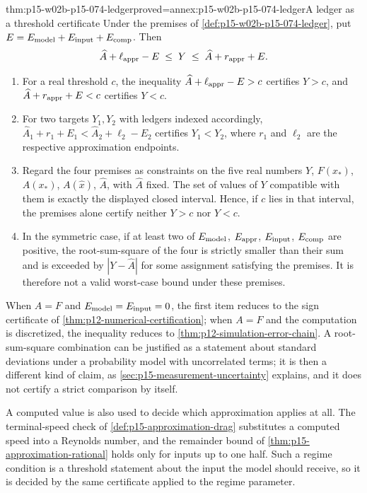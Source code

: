 \begin{hbtheorem}{thm:p15-w02b-p15-074-ledger}{proved=annex:p15-w02b-p15-074-ledger}{A ledger as a threshold certificate}
Under the premises of \cref{def:p15-w02b-p15-074-ledger}, put
\(E=E_{\rm model}+E_{\rm input}+E_{\rm comp}\). Then
\[
 \widehat A+\ell_{\rm appr}-E\;\leq\;Y\;\leq\;\widehat A+r_{\rm appr}+E.
\]
\begin{enumerate}
\item For a real threshold \(c\), the inequality
\(\widehat A+\ell_{\rm appr}-E>c\) certifies \(Y>c\), and
\(\widehat A+r_{\rm appr}+E<c\) certifies \(Y<c\).
\item For two targets \(Y_1,Y_2\) with ledgers indexed accordingly,
\(\widehat A_1+r_{1}+E_1<\widehat A_2+\ell_{2}-E_2\) certifies
\(Y_1<Y_2\), where \(r_1\) and \(\ell_2\) are the respective
approximation endpoints.
\item Regard the four premises as constraints on the five real numbers
\(Y\), \(F(x_*)\), \(A(x_*)\), \(A(\widehat x)\), \(\widehat A\), with
\(\widehat A\) fixed. The set of values of \(Y\) compatible with them is
exactly the displayed closed interval. Hence, if \(c\) lies in that
interval, the premises alone certify neither \(Y>c\) nor \(Y<c\).
\item In the symmetric case, if at least two of \(E_{\rm model}\),
\(E_{\rm appr}\), \(E_{\rm input}\), \(E_{\rm comp}\) are positive, the
root-sum-square of the four is strictly smaller than their sum and is
exceeded by \(|Y-\widehat A|\) for some assignment satisfying the premises.
It is therefore not a valid worst-case bound under these premises.
\end{enumerate}
\end{hbtheorem}

When \(A=F\) and \(E_{\rm model}=E_{\rm input}=0\), the first item reduces
to the sign certificate of \cref{thm:p12-numerical-certification}; when
\(A=F\) and the computation is discretized, the inequality reduces to
\cref{thm:p12-simulation-error-chain}. A root-sum-square combination can be
justified as a statement about standard deviations under a probability
model with uncorrelated terms; it is then a different kind of claim, as
\cref{sec:p15-measurement-uncertainty} explains, and it does not certify a
strict comparison by itself.

A computed value is also used to decide which approximation applies at all.
The terminal-speed check of \cref{def:p15-approximation-drag} substitutes a
computed speed into a Reynolds number, and the remainder bound of
\cref{thm:p15-approximation-rational} holds only for inputs up to one half.
Such a regime condition is a threshold statement about the input the model
should receive, so it is decided by the same certificate applied to the
regime parameter.


